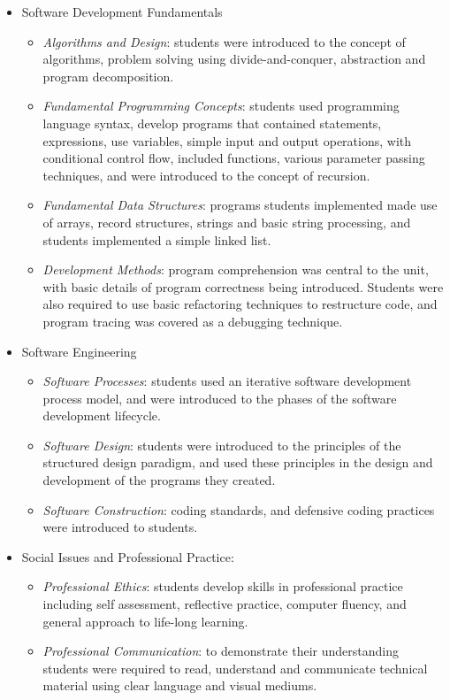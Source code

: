 \begin{itemize}[noitemsep,nolistsep]
	\item Software Development Fundamentals
	\begin{itemize}[noitemsep,nolistsep]
		\item \emph{Algorithms and Design}: students were introduced to the concept of algorithms, problem solving using divide-and-conquer, abstraction and program decomposition.
		\item \emph{Fundamental Programming Concepts}: students used programming language syntax, develop programs that contained statements, expressions, use variables, simple input and output operations, with conditional control flow, included functions, various parameter passing techniques, and were introduced to the concept of recursion.
		\item \emph{Fundamental Data Structures}: programs students implemented made use of arrays, record structures, strings and basic string processing, and students implemented a simple linked list.
		\item \emph{Development Methods}: program comprehension was central to the unit, with basic details of program correctness being introduced. Students were also required to use basic refactoring techniques to restructure code, and program tracing was covered as a debugging technique.
	\end{itemize}

	\item Software Engineering
	\begin{itemize}[noitemsep,nolistsep]
		\item \emph{Software Processes}: students used an iterative software development process model, and were introduced to the phases of the software development lifecycle. 
		\item \emph{Software Design}: students were introduced to the principles of the structured design paradigm, and used these principles in the design and development of the programs they created.
		\item \emph{Software Construction}: coding standards, and defensive coding practices were introduced to students.
	\end{itemize}

	\item Social Issues and Professional Practice:
	\begin{itemize}[noitemsep,nolistsep]
		\item \emph{Professional Ethics}: students develop skills in professional practice including self assessment, reflective practice, computer fluency, and general approach to life-long learning.
		\item \emph{Professional Communication}: to demonstrate their understanding students were required to read, understand and communicate technical material using clear language and visual mediums.
	\end{itemize}

\end{itemize}

